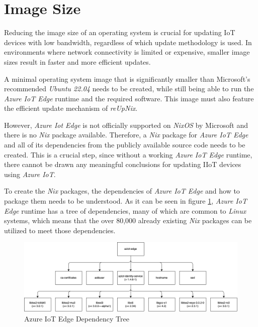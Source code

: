 \section{Image Size}
\label{sec:image-size}
Reducing the image size of an operating system is crucial for updating IoT devices
with low bandwidth, regardless of which update methodology is used.
In environments where network connectivity is limited or expensive,
smaller image sizes result in faster and more efficient updates.

A minimal operating system image that is significantly smaller
than Microsoft's recommended \textit{Ubuntu 22.04} needs to be created, while still being able to run the
\textit{Azure IoT Edge} runtime and the required software. This image must also
feature the efficient update mechanism of \textit{reUpNix}.

However, \textit{Azure Iot Edge} is not officially supported on \textit{NixOS}
by Microsoft and there is no \textit{Nix} package available. Therefore, a \textit{Nix} package 
for \textit{Azure IoT Edge} and all of its dependencies from the publicly available source code
needs to be created. This is a crucial step, since
without a working \textit{Azure IoT Edge} runtime, there cannot be drawn any meaningful
conclusions for updating \ac{IIoT} devices using \textit{Azure IoT}.

To create the \textit{Nix} packages, the dependencies of
\textit{Azure IoT Edge} and how to package them needs to be understood. As it can be seen in figure
\ref{fig:dependency-tree}, \textit{Azure IoT Edge} runtime has a tree of dependencies,
many of which are common to \textit{Linux} systems, which means that the over 80,000 already 
existing \textit{Nix} packages can be utilized to meet those dependencies.
\clearpage

\begin{figure}[H]
    \centering
    \includegraphics[width=\textwidth]{fig/dependecy-tree.drawio.png}
    \caption{Azure IoT Edge Dependency Tree}
    \label{fig:dependency-tree}
\end{figure}



